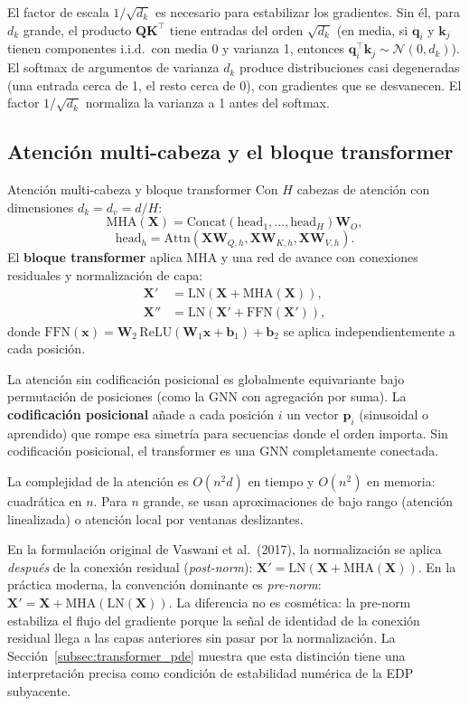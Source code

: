 El factor de escala $1/\sqrt{d_k}$ es necesario para estabilizar los gradientes.
Sin él, para $d_k$ grande, el producto $\bm{Q}\bm{K}^\top$ tiene entradas del
orden $\sqrt{d_k}$ (en media, si $\bm{q}_i$ y $\bm{k}_j$ tienen componentes
i.i.d.\ con media 0 y varianza 1, entonces $\bm{q}_i^\top\bm{k}_j \sim
\mathcal{N}(0,d_k)$). El softmax de argumentos de varianza $d_k$ produce
distribuciones casi degeneradas (una entrada cerca de 1, el resto cerca de 0),
con gradientes que se desvanecen. El factor $1/\sqrt{d_k}$ normaliza la
varianza a 1 antes del softmax.

\subsection{Atención multi-cabeza y el bloque transformer}
\label{subsec:transformer}

\begin{definicion}{Atención multi-cabeza y bloque transformer}
\label{def:transformer}
Con $H$ cabezas de atención con dimensiones $d_k = d_v = d/H$:
\[
  \mathrm{MHA}(\bm{X})
  = \mathrm{Concat}(\mathrm{head}_1,\ldots,\mathrm{head}_H)\bm{W}_O,
\]
\[
  \mathrm{head}_h = \mathrm{Attn}(\bm{X}\bm{W}_{Q,h},\bm{X}\bm{W}_{K,h},
  \bm{X}\bm{W}_{V,h}).
\]
El \textbf{bloque transformer} aplica MHA y una red de avance con conexiones
residuales y normalización de capa:
\begin{align*}
  \bm{X}' &= \mathrm{LN}(\bm{X} + \mathrm{MHA}(\bm{X})), \\
  \bm{X}'' &= \mathrm{LN}(\bm{X}' + \mathrm{FFN}(\bm{X}')),
\end{align*}
donde $\mathrm{FFN}(\bm{x}) = \bm{W}_2\,\mathrm{ReLU}(\bm{W}_1\bm{x}+\bm{b}_1)
+ \bm{b}_2$ se aplica independientemente a cada posición.
\end{definicion}

La atención sin codificación posicional es globalmente equivariante bajo
permutación de posiciones (como la GNN con agregación por suma). La
\textbf{codificación posicional} añade a cada posición $i$ un vector
$\bm{p}_i$ (sinusoidal o aprendido) que rompe esa simetría para secuencias
donde el orden importa. Sin codificación posicional, el transformer es
una GNN completamente conectada.

La complejidad de la atención es $O(n^2 d)$ en tiempo y $O(n^2)$ en memoria:
cuadrática en $n$. Para $n$ grande, se usan aproximaciones de bajo rango
(atención linealizada) o atención local por ventanas deslizantes.

En la formulación original de Vaswani et al.\ (2017),
la normalización se aplica \emph{después} de la conexión residual
(\textit{post-norm}):
$\bm{X}' = \mathrm{LN}(\bm{X} + \mathrm{MHA}(\bm{X}))$.
En la práctica moderna, la convención dominante es \textit{pre-norm}:
$\bm{X}' = \bm{X} + \mathrm{MHA}(\mathrm{LN}(\bm{X}))$.
La diferencia no es cosmética: la pre-norm estabiliza el flujo del
gradiente porque la señal de identidad de la conexión residual llega
a las capas anteriores sin pasar por la normalización.
La Sección~\ref{subsec:transformer_pde} muestra que esta distinción
tiene una interpretación precisa como condición de estabilidad
numérica de la EDP subyacente.


